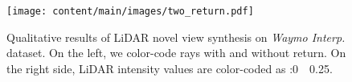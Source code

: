 \begin{figure}[t]
    \centering
        \texttt{[image: content/main/images/two\_return.pdf]}
        \caption{Qualitative results of LiDAR novel view synthesis on \textit{Waymo Interp.} dataset. On the left, we color-code rays {\setlength{\fboxsep}{0pt}\colorbox{hit}{with}} and {\setlength{\fboxsep}{0pt}\colorbox{ourgray}{without}} return. On the right side, LiDAR intensity values are color-coded as :0~\coolwarm~0.25.}
    \label{fig:two_return}
\end{figure}